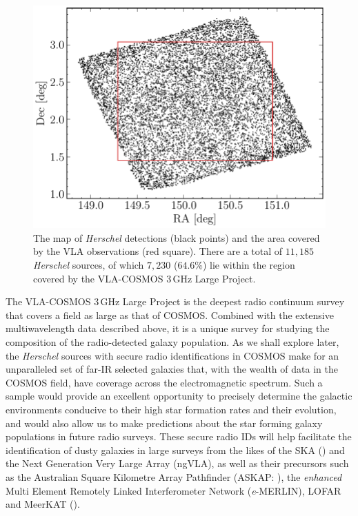 \begin{figure}
	\centering
	\includegraphics[width=0.8\columnwidth]{Figures/sky_map.pdf}
	\caption[Map of the \textit{Herschel} and VLA observations in the COSMOS field]{The map of \textit{Herschel} detections (black points) and the area covered by the VLA observations (red square). There are a total of $11,185$ \textit{Herschel} sources, of which $7,230$ ($64.6$\%) lie within the region covered by the VLA-COSMOS $3\,$GHz Large Project.}
	\label{fig:sky_map}
\end{figure}

The VLA-COSMOS $3\,$GHz Large Project is the deepest radio continuum survey that covers a field as large as that of COSMOS. Combined with the extensive multiwavelength data described above, it is a unique survey for studying the composition of the radio-detected galaxy population. As we shall explore later, the \textit{Herschel} sources with secure radio identifications in COSMOS make for an unparalleled set of far-IR selected galaxies that, with the wealth of data in the COSMOS field, have coverage across the electromagnetic spectrum. Such a sample would provide an excellent opportunity to precisely determine the galactic environments conducive to their high star formation rates and their evolution, and would also allow us to make predictions about the star forming galaxy populations in future radio surveys. These secure radio IDs will help facilitate the identification of dusty galaxies in large surveys from the likes of the SKA (\citealt{Dewdney_2009}) and the Next Generation Very Large Array (ngVLA), as well as their precursors such as the Australian Square Kilometre Array Pathfinder (ASKAP: \citealt{Johnston_2007}), the \textit{enhanced} Multi Element Remotely Linked Interferometer Network (\textit{e}-MERLIN), LOFAR and MeerKAT (\citealt{Jonas_2009}).

